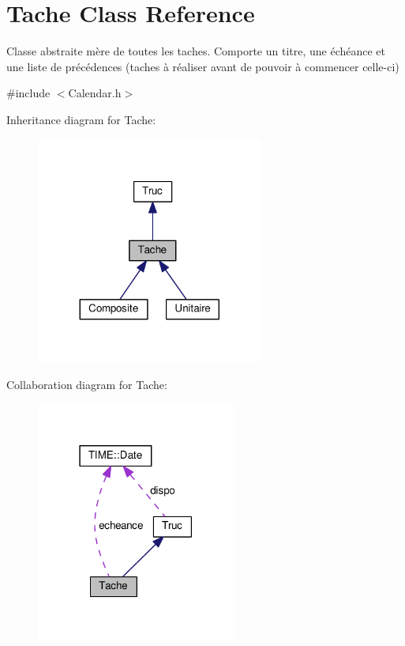 \hypertarget{class_tache}{}\section{Tache Class Reference}
\label{class_tache}


Classe abstraite mère de toutes les taches. Comporte un titre, une échéance et une liste de précédences (taches à réaliser avant de pouvoir à commencer celle-\/ci)  




{\ttfamily \#include $<$Calendar.\+h$>$}



Inheritance diagram for Tache\+:\nopagebreak
\begin{figure}[H]
\begin{center}
\leavevmode
\includegraphics[width=212pt]{class_tache__inherit__graph}
\end{center}
\end{figure}


Collaboration diagram for Tache\+:\nopagebreak
\begin{figure}[H]
\begin{center}
\leavevmode
\includegraphics[width=186pt]{class_tache__coll__graph}
\end{center}
\end{figure}
